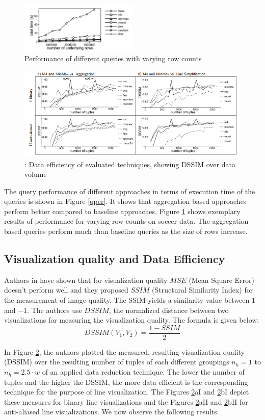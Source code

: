\begin{figure}
	\includegraphics[width=0.5\textwidth]{pv}
	\caption{Performance of different queries with varying row counts}
	\label{vr}
\end{figure}
\begin{figure}
	\includegraphics[width=\textwidth]{dsim}
	\caption{: Data efficiency of evaluated techniques, showing DSSIM over data volume}
	\label{dsim}
\end{figure}

The query performance of different approaches in terms of execution time of the queries is shown in Figure \ref{qper}. It shows that aggregation based approaches perform better compared to baseline approaches. Figure \ref{vr} shows exemplary results of performance  for varying row counts on soccer data. The aggregation based queries perform much than baseline queries as the size of rows increase. 

\subsection{Visualization quality and Data Efficiency}
Authors in \cite{wang2004image} have shown that for visualization quality $MSE$ (Mean Square Error) doesn't perform well and they proposed $SSIM$ (Structural
Similarity Index) for the measurement of image quality. The SSIM yields a similarity
value between 1 and −1. The authors use $DSSIM$, the normalized distance between two visualizations for measuring the visualization quality. The formula is given below:
\begin{equation}
DSSIM(V_1, V_2) = \frac{1 - SSIM}{2}
\end{equation}

In Figure \ref{dsim}, the authors plotted the measured, resulting visualization
quality (DSSIM) over the resulting number of tuples of each
different groupings $n_h = 1$ to $n_h = 2.5·w$ of an applied data
reduction technique. The lower the number of
tuples and the higher the DSSIM, the more data efficient is
the corresponding technique for the purpose of line visualization.
The Figures \ref{dsim}aI and \ref{dsim}bI depict these measures for
binary line visualizations and the Figures \ref{dsim}aII and \ref{dsim}bII
for anti-aliased line visualizations. We now observe the following
results.
